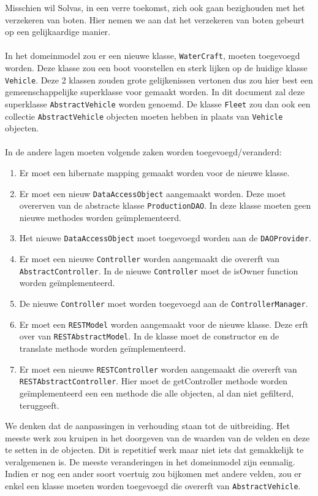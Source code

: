 \documentclass{article}
\begin{document}
Misschien wil Solvas, in een verre toekomst, zich ook gaan bezighouden met het verzekeren van boten. Hier nemen we aan dat het verzekeren van boten gebeurt op een gelijkaardige manier.
\\
\\
In het domeinmodel zou er een nieuwe klasse, \verb|WaterCraft|, moeten toegevoegd worden. Deze klasse zou een boot voorstellen en sterk lijken op de huidige klasse \verb|Vehicle|. Deze 2 klassen zouden grote gelijkenissen vertonen dus zou hier best een gemeenschappelijke superklasse voor gemaakt worden. In dit document zal deze superklasse \verb|AbstractVehicle| worden genoemd. De klasse \verb|Fleet| zou dan ook een collectie \verb|AbstractVehicle| objecten moeten hebben in plaats van \verb|Vehicle| objecten.
\\
\\
In de andere lagen moeten volgende zaken worden toegevoegd/veranderd:
\begin{enumerate}
	\item Er moet een hibernate mapping gemaakt worden voor de nieuwe klasse.
	\item Er moet een nieuw \verb|DataAccessObject| aangemaakt worden. Deze moet overerven van de abstracte klasse \verb|ProductionDAO|. In deze klasse moeten geen nieuwe methodes worden geïmplementeerd.
	\item Het nieuwe \verb|DataAccessObject| moet toegevoegd worden aan de \verb|DAOProvider|.
	\item Er moet een nieuwe \verb|Controller| worden aangemaakt die overerft van \verb|AbstractController|. In de nieuwe \verb|Controller| moet de isOwner function worden geïmplementeerd.
	\item De nieuwe \verb|Controller| moet worden toegevoegd aan de \verb|ControllerManager|.
	\item Er moet een \verb|RESTModel| worden aangemaakt voor de nieuwe klasse. Deze erft over van \verb|RESTAbstractModel|. In de klasse moet de constructor en de translate methode worden geïmplementeerd.
	\item Er moet een nieuwe \verb|RESTController| worden aangemaakt die overerft van \verb|RESTAbstractController|. Hier moet de getController methode worden geïmplementeerd een een methode die alle objecten, al dan niet gefilterd, teruggeeft.
\end{enumerate}

We denken dat de aanpassingen in verhouding staan tot de uitbreiding. Het meeste werk zou kruipen in het doorgeven van de waarden van de velden en deze te setten in de objecten. Dit is repetitief werk maar niet iets dat gemakkelijk te veralgemenen is. De meeste veranderingen in het domeinmodel zijn eenmalig. Indien er nog een ander soort voertuig zou bijkomen met andere velden, zou er enkel een klasse moeten worden toegevoegd die overerft van \verb|AbstractVehicle|.
\end{document}
